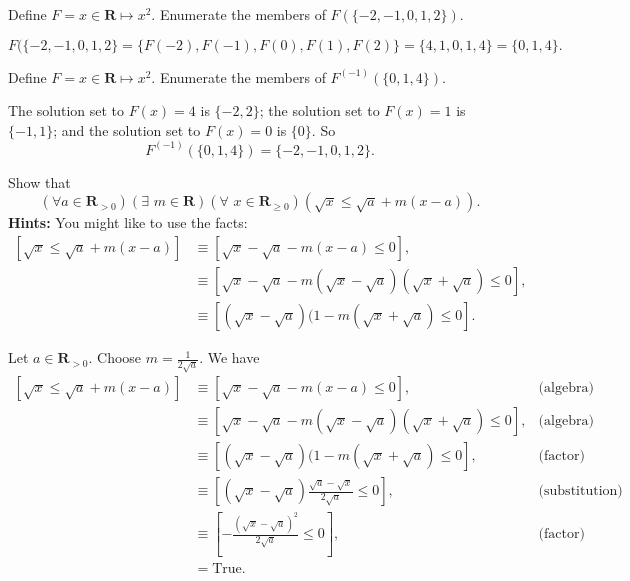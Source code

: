 \documentclass[12pt,fleqn,answers]{exam}
\newcommand{\reals}{\mathbf{R}}
\newcommand{\True}{\mbox{True}}
\begin{document}
\large

\begin{questions} 

\question Define $F = x \in \reals \mapsto x^2$. Enumerate
the members of $F(\{-2,-1,0,1,2 \})$.
\begin{solution}
\[
    F(\{-2,-1,0,1,2 \} = \{F(-2),F(-1),F(0),F(1), F(2) \}
                       = \{4,1,0,1,4 \} =  \{0,1,4 \}.
\]
\end{solution}

\question  Define $F = x \in \reals \mapsto x^2$. Enumerate
the members of $F^{(-1)} (\{0,1,4 \})$.

\begin{solution}
The solution set to $F(x) = 4$ is $\{-2,2\}$; the solution set to $F(x) = 1$ is $\{-1,1\}$;
and the solution set to $F(x) = 0$ is $\{0\}$. So
\[
    F^{(-1)} (\{0,1,4 \}) = \{-2,-1,0,1,2 \}.
\]
\end{solution}

\question Show that
\begin{equation*}
 \left(\forall a \in \reals_{>0}\right) \left  (\exists \,\, m \in \reals \right )  \left (\forall \,\,
 x \in \reals_{\geq 0} \right ) \left (\sqrt{x} \leq \sqrt{a} + m (x-a) \right).
\end{equation*}
\textbf{Hints:} You might like to use the facts:
\begin{align*}
    \left[ \sqrt{x} \leq \sqrt{a} + m (x-a) \right] &\equiv
    \left[ \sqrt{x} - \sqrt{a} - m (x-a) \leq 0 \right], \\
    &\equiv  \left[ \sqrt{x} - \sqrt{a} - m  (\sqrt{x} - \sqrt{a}) 
          (\sqrt{x} + \sqrt{a}) \leq 0 \right], \\
    &\equiv \left[ (\sqrt{x} - \sqrt{a}) (1 - m  (\sqrt{x} + \sqrt{a}) \leq 0 \right].
\end{align*}

\begin{solution}
Let $a \in \reals_{>0}$. Choose $m = \frac{1}{2 \sqrt{a}}$. We have
\begin{align*}
    \left[ \sqrt{x} \leq \sqrt{a} + m (x-a) \right] &\equiv
    \left[ \sqrt{x} - \sqrt{a} - m (x-a) \leq 0 \right], &\mbox{(algebra)}\\
    &\equiv  \left[ \sqrt{x} - \sqrt{a} - m  (\sqrt{x} - \sqrt{a}) 
          (\sqrt{x} + \sqrt{a}) \leq 0 \right], &\mbox{(algebra)} \\
    &\equiv \left[ (\sqrt{x} - \sqrt{a}) (1 - m  (\sqrt{x} + \sqrt{a}) \leq 0 \right], &\mbox{(factor)} \\
    &\equiv \left[ (\sqrt{x} - \sqrt{a}) \frac{\sqrt{a} - \sqrt{x}}{2 \sqrt{a}}\leq 0 \right], &\mbox{(substitution)} \\
    &\equiv \left[ -\frac{(\sqrt{x} - \sqrt{a})^2} {2 \sqrt{a}}\leq 0 \right], &\mbox{(factor)} \\
    &= \True.
\end{align*}


\end{solution}
\end{questions}
\end{document}
